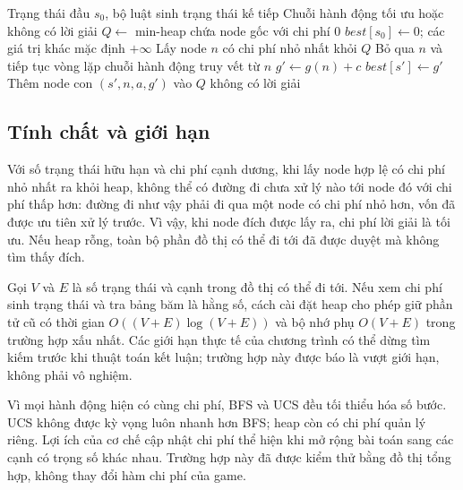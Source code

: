 \begin{algorithm}[htbp]
    \caption{UCS trên trạng thái Bloxorz}
    \label{alg:ucs}
    \begin{algorithmic}[1]
        \Require Trạng thái đầu $s_0$, bộ luật sinh trạng thái kế tiếp
        \Ensure Chuỗi hành động tối ưu hoặc không có lời giải
        \State $Q\gets$ min-heap chứa node gốc với chi phí $0$
        \State $best[s_0]\gets 0$; các giá trị khác mặc định $+\infty$
            \State Lấy node $n$ có chi phí nhỏ nhất khỏi $Q$
                \State Bỏ qua $n$ và tiếp tục vòng lặp
            \Else
                    \State \Return chuỗi hành động truy vết từ $n$
                \EndIf
                    \State $g'\gets g(n)+c$
                        \State $best[s']\gets g'$
                        \State Thêm node con $(s',n,a,g')$ vào $Q$
                    \EndIf
                \EndFor
            \EndIf
        \EndWhile
        \State \Return không có lời giải
    \end{algorithmic}
\end{algorithm}

\subsection{Tính chất và giới hạn}

Với số trạng thái hữu hạn và chi phí cạnh dương, khi lấy node hợp lệ có
chi phí nhỏ nhất ra khỏi heap, không thể có đường đi chưa xử lý nào tới
node đó với chi phí thấp hơn: đường đi như vậy phải đi qua một node có
chi phí nhỏ hơn, vốn đã được ưu tiên xử lý trước. Vì vậy, khi node đích
được lấy ra, chi phí lời giải là tối ưu. Nếu heap rỗng, toàn bộ phần đồ thị
có thể đi tới đã được duyệt mà không tìm thấy đích.

Gọi $V$ và $E$ là số trạng thái và cạnh trong đồ thị có thể đi tới. Nếu xem
chi phí sinh trạng thái và tra bảng băm là hằng số, cách cài đặt heap cho
phép giữ phần tử cũ có thời gian $O((V+E)\log(V+E))$ và bộ nhớ phụ
$O(V+E)$ trong trường hợp xấu nhất. Các giới hạn thực tế của chương trình
có thể dừng tìm kiếm trước khi thuật toán kết luận; trường hợp này được
báo là vượt giới hạn, không phải vô nghiệm.

Vì mọi hành động hiện có cùng chi phí, BFS và UCS đều tối thiểu hóa số
bước. UCS không được kỳ vọng luôn nhanh hơn BFS; heap còn có chi phí quản
lý riêng. Lợi ích của cơ chế cập nhật chi phí thể hiện khi mở rộng bài toán
sang các cạnh có trọng số khác nhau. Trường hợp này đã được kiểm thử bằng
đồ thị tổng hợp, không thay đổi hàm chi phí của game.
